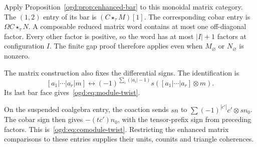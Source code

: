 Apply Proposition~\ref{ogd:prop:enhanced-bar} to this monoidal matrix category.
The $(1,2)$ entry of its bar is $(C\star_\tau M)[1]$.
The corresponding cobar entry is $\Omega C\star_\tau N$.
A composable reduced matrix word contains at most one off-diagonal factor.
Every other factor is positive, so the word has at most $|I|+1$ factors at configuration $I$.
The finite gap proof therefore applies even when $M_\varnothing$ or $N_\varnothing$ is nonzero.

The matrix construction also fixes the differential signs.
The identification is
\[
 [a_1|\cdots|a_r|m]\longleftrightarrow
 (-1)^{\sum_i(|a_i|-1)}s([a_1|\cdots|a_r]\otimes m).
\]
Its last bar face gives~\eqref{ogd:eq:module-twist}.

On the suspended coalgebra entry, the coaction sends
$sn$ to $\sum(-1)^{|c'|}c'\otimes sn_0$.
The cobar sign then gives $-(tc')n_0$, with the tensor-prefix sign from preceding factors.
This is~\eqref{ogd:eq:comodule-twist}.
Restricting the enhanced matrix comparisons to these entries supplies their units, counits and triangle coherences.

